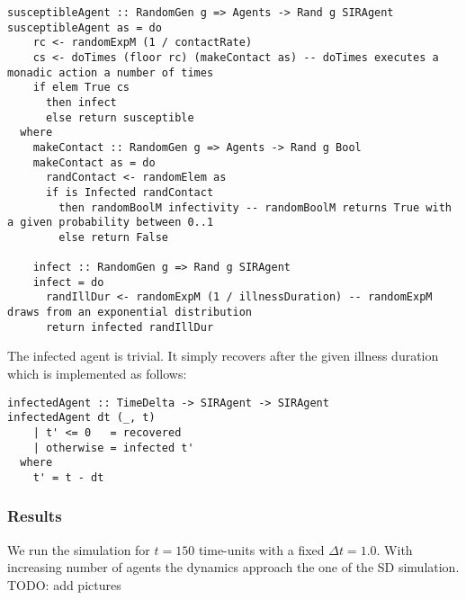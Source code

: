 \begin{verbatim}
susceptibleAgent :: RandomGen g => Agents -> Rand g SIRAgent
susceptibleAgent as = do
    rc <- randomExpM (1 / contactRate)
    cs <- doTimes (floor rc) (makeContact as) -- doTimes executes a monadic action a number of times
    if elem True cs
      then infect
      else return susceptible
  where
    makeContact :: RandomGen g => Agents -> Rand g Bool
    makeContact as = do
      randContact <- randomElem as
      if is Infected randContact
        then randomBoolM infectivity -- randomBoolM returns True with a given probability between 0..1
        else return False

    infect :: RandomGen g => Rand g SIRAgent
    infect = do
      randIllDur <- randomExpM (1 / illnessDuration) -- randomExpM draws from an exponential distribution
      return infected randIllDur
\end{verbatim}

The infected agent is trivial. It simply recovers after the given illness duration which is implemented as follows:

\begin{verbatim}
infectedAgent :: TimeDelta -> SIRAgent -> SIRAgent
infectedAgent dt (_, t) 
    | t' <= 0   = recovered
    | otherwise = infected t'
  where
    t' = t - dt  
\end{verbatim}

\subsubsection{Results}
We run the simulation for $t = 150$ time-units with a fixed $\Delta t = 1.0$. With increasing number of agents the dynamics approach the one of the SD simulation. TODO: add pictures

